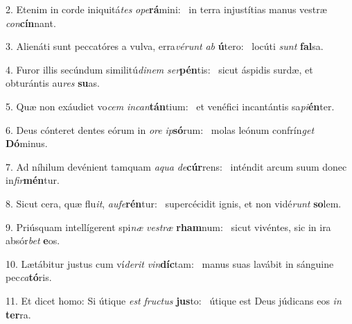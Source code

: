2. Etenim in corde iniquitá\textit{tes} \textit{o}\textit{pe}\textbf{rá}mini: \ast\  in terra injustítias manus vestræ \textit{con}\textbf{cín}nant.\

3. Alienáti sunt peccatóres a vulva, erra\textit{vé}\textit{runt} \textit{ab} \textbf{ú}tero: \ast\  locúti \textit{sunt} \textbf{fal}sa.\

4. Furor illis secúndum similitú\textit{di}\textit{nem} \textit{ser}\textbf{pén}tis: \ast\  sicut áspidis surdæ, et obturántis au\textit{res} \textbf{su}as.\

5. Quæ non exáudiet vo\textit{cem} \textit{in}\textit{can}\textbf{tán}tium: \ast\  et venéfici incantántis sa\textit{pi}\textbf{én}ter.\

6. Deus cónteret dentes eórum in \textit{o}\textit{re} \textit{ip}\textbf{só}rum: \ast\  molas leónum confrín\textit{get} \textbf{Dó}minus.\

7. Ad níhilum devénient tamquam \textit{a}\textit{qua} \textit{de}\textbf{cúr}rens: \ast\  inténdit arcum suum donec in\textit{fir}\textbf{mén}tur.\

8. Sicut cera, quæ flu\textit{it}, \textit{au}\textit{fe}\textbf{rén}tur: \ast\  supercécidit ignis, et non vidé\textit{runt} \textbf{so}lem.\

9. Priúsquam intellígerent spi\textit{næ} \textit{ves}\textit{træ} \textbf{rham}num: \ast\  sicut vivéntes, sic in ira absór\textit{bet} \textbf{e}os.\

10. Lætábitur justus cum ví\textit{de}\textit{rit} \textit{vin}\textbf{díc}tam: \ast\  manus suas lavábit in sánguine pec\textit{ca}\textbf{tó}ris.\

11. Et dicet homo: Si útique \textit{est} \textit{fruc}\textit{tus} \textbf{jus}to: \ast\  útique est Deus júdicans eos \textit{in} \textbf{ter}ra.\

